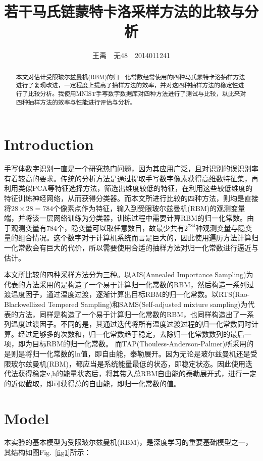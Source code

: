 \documentclass[journal,a4paper]{IEEEtran}
\title{\huge{若干马氏链蒙特卡洛采样方法的比较与分析}}
\author{王禹~~无48~~2014011241}
\begin{document}
	\maketitle
	\begin{abstract}

		本文对估计受限玻尔兹曼机(RBM)的归一化常数经常使用的四种马氏蒙特卡洛抽样方法进行了复现改进，一定程度上提高了抽样方法的效率，并对这四种抽样方法的稳定性进行了比较分析。我使用MNIST手写数字数据库对四种方法进行了测试与比较，以此来对四种抽样方法的效率与性能进行评估与分析。

	\end{abstract}


	\section{Introduction}
	 手写体数字识别一直是一个研究热门问题，因为其应用广泛，且对识别的误识别率有着较高的要求。传统的分析方法是通过提取手写数字像素获得高维数特征集，再利用类似PCA等特征选择方法，筛选出维度较低的特征，在利用这些较低维度的特征训练神经网络，从而获得分类器。而本文所进行比较的四种方法，则均是直接将$ 28 \times 28 = 784$个像素点作为特征，输入到受限玻尔兹曼机(RBM)的观测变量端，并将该一层网络训练为分类器，训练过程中需要计算RBM的归一化常数。由于观测变量有784个，隐变量可以取任意数目，故最少共有$ 2^784 $种观测变量与隐变量的组合情况。这个数字对于计算机系统而言是巨大的，因此使用遍历方法计算归一化常数会有巨大的代价，所以需要使用合适的抽样方法对归一化常数进行逼近与估计。

	 本文所比较的四种采样方法分为三种。以AIS(Annealed Importance Sampling)\cite{salakhutdinov2009learning}为代表的方法采用的是构造了一个易于计算归一化常数的RBM，然后构造一系列过渡温度因子，通过温度过渡，逐渐计算出目标RBM的归一化常数。以RTS(Rao-Blackwellized Tempered Sampling)\cite{carlson2016partition}和SAMS(Self-adjusted mixture sampling)\cite{tan2015optimally}为代表的方法，同样是构造了一个易于计算归一化常数的RBM，也同样构造出了一系列温度过渡因子。不同的是，其通过迭代将所有温度过渡过程的归一化常数同时计算。经过足够多的次数和，归一化常数趋于稳定，去除归一化常数数列的最后一项，即为目标RBM的归一化常数。	而TAP(Thouless-Anderson-Palmer)\cite{gabrie2015training}所采用的是则是将归一化常数的ln值，即自由能，泰勒展开。因为无论是玻尔兹曼机还是受限玻尔兹曼机(RBM)，都应当是系统能量最低的状态，即稳定状态。因此使用迭代法获得稳定v,h的能量状态后，将其带入总RBM自由能的泰勒展开式，进行一定的近似截取，即可获得总的自由能，即归一化常数的值。
	\section{Model}
	本实验的基本模型为受限玻尔兹曼机(RBM)，是深度学习的重要基础模型之一，其结构如图Fig.~\ref{fig1}所示：
\end{document}
